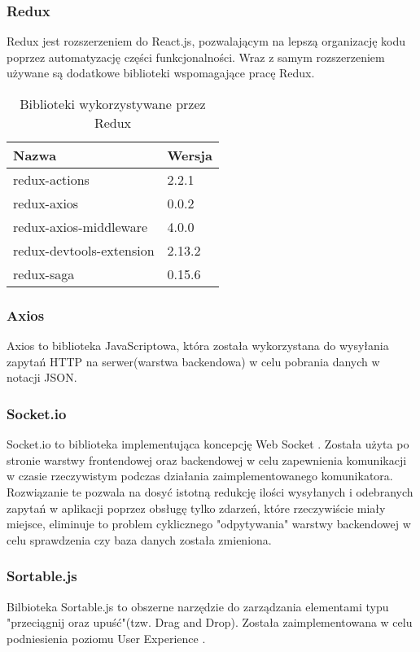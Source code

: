 \documentclass[eng,printmode]{mgr}
\begin{document}
\subsubsection{Redux}
Redux \cite {Redux} jest rozszerzeniem do React.js, pozwalającym na lepszą organizację kodu poprzez automatyzację części funkcjonalności. Wraz z samym rozszerzeniem używane są dodatkowe biblioteki wspomagające pracę Redux.

\begin{table}[H]
\begin{tabularx}{\textwidth}{|X|X|}
   \hline
    \textbf{Nazwa} & \textbf{Wersja} \\
   \hline
    redux-actions & 2.2.1 \\
   \hline
   	redux-axios & 0.0.2 \\
   \hline
  	redux-axios-middleware & 4.0.0 \\
   \hline
   	redux-devtools-extension & 2.13.2 \\
   \hline
  	redux-saga & 0.15.6 \\
   \hline
\end{tabularx}
\caption{Biblioteki wykorzystywane przez Redux}
\end{table}


\subsubsection{Axios}
Axios \cite {Axios} to biblioteka JavaScriptowa, która została wykorzystana do wysyłania zapytań HTTP na serwer(warstwa backendowa) w celu pobrania danych w notacji JSON.

\subsubsection{Socket.io}
Socket.io \cite {SocketIO} to biblioteka implementująca koncepcję Web Socket \cite {Keyword_Websocket}. Została użyta po stronie warstwy frontendowej oraz backendowej w celu zapewnienia komunikacji w czasie rzeczywistym podczas działania zaimplementowanego komunikatora. Rozwiązanie te pozwala na dosyć istotną redukcję ilości wysyłanych i odebranych zapytań w aplikacji poprzez obsługę tylko zdarzeń, które rzeczywiście miały miejsce, eliminuje to problem cyklicznego "odpytywania" warstwy backendowej w celu sprawdzenia czy baza danych została zmieniona.

\subsubsection{Sortable.js}
Bilbioteka Sortable.js \cite{SortableJS} to obszerne narzędzie do zarządzania elementami typu "przeciągnij oraz upuść"(tzw. Drag and Drop). Została zaimplementowana w celu podniesienia poziomu User Experience \cite {Keyword_UserExperience}.
\end{document}
